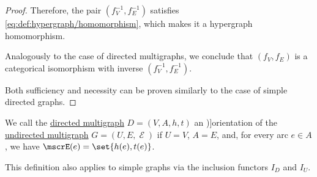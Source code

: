 \begin{proof}
  Therefore, the pair \( (f_V^{-1}, f_E^{-1}) \) satisfies \eqref{eq:def:hypergraph/homomorphism}, which makes it a hypergraph homomorphism.

  Analogously to the case of directed multigraphs, we conclude that \( (f_V, f_E) \) is a categorical isomorphism with inverse \( (f_V^{-1}, f_E^{-1}) \).

   Both sufficiency and necessity can be proven similarly to the case of simple directed graphs.
\end{proof}

\begin{definition}\label{def:multigraph_orientation}
  We call the \hyperref[def:directed_multigraph]{directed multigraph} \( D = (V, A, h, t) \) an \term[ru=ориентация (\cite[32]{Емеличев1990Графы})]{orientation} of the \hyperref[def:hypergraph/multigraph]{undirected multigraph} \( G = (U, E, \mscrE) \) if \( U = V \), \( A = E \), and, for every arc \( e \in A \), we have \( \mscrE(e) = \set{ h(e), t(e) } \).
\end{definition}
\begin{comments}
  \item This definition also applies to simple graphs via the inclusion functors \hyperref[def:graph_functors/directed_inclusion]{\( I_D \)} and \hyperref[def:graph_functors/undirected_inclusion]{\( I_U \)}.
\end{comments}

